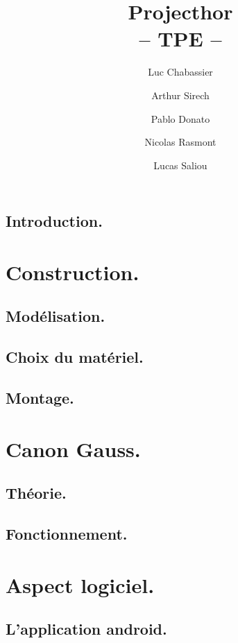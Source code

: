 \documentclass{report}
\title{Projecthor\\-- TPE --}
\author{Luc Chabassier \and Arthur Sirech \and Pablo Donato \and Nicolas Rasmont \and Lucas Saliou}
\begin{document}
\maketitle

\tableofcontents

\chapter{Introduction.} \label{intro}


\part{Construction.}
\chapter{Modélisation.} \label{moter}


\chapter{Choix du matériel.} \label{mater} %


\chapter{Montage.} \label{mont}


\part{Canon Gauss.}
\chapter{Théorie.} \label{gauss}


\chapter{Fonctionnement.} \label{fonc}


\part{Aspect logiciel.}
\chapter{L'application android.} \label{andro}

\end{document}
